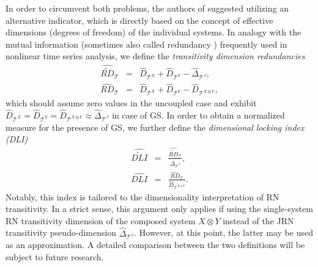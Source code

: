 		In order to circumvent both problems, the authors of \cite{Donner2015RPBook} suggested utilizing an alternative indicator, which is directly based on the concept of effective dimensions (degrees of freedom) of the individual systems. In analogy with the mutual information (sometimes also called redundancy \cite{Palus1995,Prichard1995}) frequently used in nonlinear time series analysis, we define the \emph{transitivity dimension redundancies} \cite{Donner2015RPBook}
\begin{eqnarray}
\hat{\tilde{RD}}_{\mathcal{T}}&=&\hat{D}_{\mathcal{T}^X}+\hat{D}_{\mathcal{T}^Y}-\hat{\Delta}_{\mathcal{T}^J}, \\
\hat{RD}_{\mathcal{T}}&=&\hat{D}_{\mathcal{T}^X}+\hat{D}_{\mathcal{T}^Y}-\hat{D}_{\mathcal{T}^{X\otimes Y}},
\end{eqnarray}
which should assume zero values in the uncoupled case and exhibit $\hat{D}_{\mathcal{T}^X}=\hat{D}_{\mathcal{T}^Y}=\hat{D}_{\mathcal{T}^{X\otimes Y}}\approx\hat{\Delta}_{\mathcal{T}^J}$ in case of GS. In order to obtain a normalized measure for the presence of GS, we further define the \emph{dimensional locking index (DLI)}
\begin{eqnarray} \label{eq:DLItilde}
\widehat{\widetilde{DLI}} &=& \frac{\hat{\tilde{RD}}_{\mathcal{T}}}{\hat{\Delta}_{\mathcal{T}^J}}, \\
\widehat{DLI} &=& \frac{\hat{RD}_{\mathcal{T}}}{\hat{D}_{\mathcal{T}^{X\otimes Y}}}.
\end{eqnarray}
\noindent
Notably, this index is tailored to the dimensionality interpretation of RN transitivity. In a strict sense, this argument only applies if using the single-system RN transitivity dimension of the composed system $X\otimes Y$ instead of the JRN transitivity pseudo-dimension $\hat{\Delta}_{\mathcal{T}^J}$. However, at this point, the latter may be used as an approximation. A detailed comparison between the two definitions will be subject to future research.

